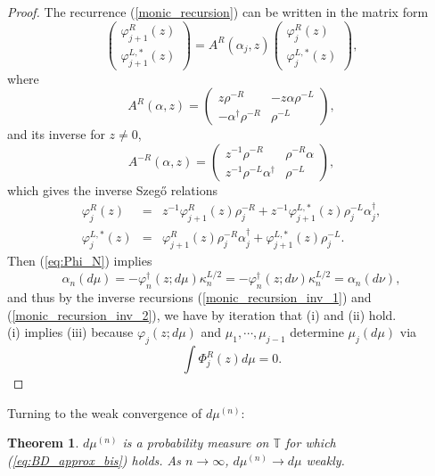 \documentclass[11pt]{article}
\newtheorem{theorem}{Theorem}[section]
\begin{document}
\begin{proof}
    The recurrence (\ref{monic_recursion}) can be written in the matrix form
    $$
    \begin{pmatrix}
    \varphi_{j+1}^{R}(z) \\
    \varphi_{j+1}^{L,*}(z) 
    \end{pmatrix}= A^{R}(\alpha_{j},z)\begin{pmatrix}
    \varphi_{j}^{R}(z) \\
    \varphi_{j}^{L,*}(z) 
    \end{pmatrix},
    $$ 
    where
    $$
    A^{R}(\alpha,z) = \begin{pmatrix}
    z \rho^{-R} & -z \alpha \rho^{-L} \\
    - \alpha^{\dag} \rho^{-R}  & \rho^{-L}
    \end{pmatrix},
    $$
    and its inverse for $z \neq 0$,
    $$
    A^{-R}(\alpha,z) = \begin{pmatrix}
    z^{-1}  \rho^{-R} & \rho^{-R}\alpha\\
    z^{-1} \rho^{-L} \alpha^{\dag} & \rho^{-L}
    \end{pmatrix},
    $$
    which gives the inverse Szeg\H{o} relations 
    \begin{eqnarray} 
    \varphi_{j}^{R}(z) &=& z^{-1} \varphi_{j+1}^{R}(z) \rho_{j}^{-R} + z^{-1} \varphi_{j+1}^{L,*}(z) \rho_{j}^{-L} \alpha^{\dag}_j \label{monic_recursion_inv_1},\\
    \varphi_{j}^{L,*}(z) &=& \varphi_{j+1}^{R}(z) \rho_{j}^{-R} \alpha^{\dag}_j + \varphi_{j+1}^{L,*}(z) \rho_{j}^{-L}. \label{monic_recursion_inv_2}
    \end{eqnarray} 
    Then (\ref{eq:Phi_N}) implies $$\alpha_{n}(d\mu) = - \varphi_{n}^{\dag}(z;d\mu)\kappa_{n}^{L/2}= - \varphi_{n}^{\dag}(z;d\nu)\kappa_{n}^{L/2} = \alpha_{n}(d\nu),$$
    and thus by the inverse recursions (\ref{monic_recursion_inv_1}) and (\ref{monic_recursion_inv_2}), we have by iteration that (i) and (ii) hold.\\
    (i) implies (iii) because $\varphi_{j}(z;d\mu)$ and $\mu_{1}, \cdots, \mu_{j-1}$ determine $\mu_{j}(d\mu)$ via $$\int \Phi^{R}_{j}(z)d\mu=0.$$
\end{proof}
\noindent Turning to the weak convergence of $d\mu^{(n)}$:
\begin{theorem}
$d\mu^{(n)}$ is a probability measure on $\mathbb{T}$ for which (\ref{eq:BD_approx_bis}) holds. As $n \rightarrow \infty$, $d\mu^{(n)}\rightarrow d\mu$ weakly.
\end{theorem}
\end{document}
